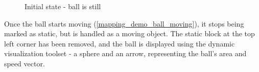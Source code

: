 \begin{figure}[!ht]
    \centering
    \caption{Initial state - ball is still}
    \label{mapping_demo_start}
\end{figure}

Once the ball starts moving (\autoref{mapping_demo_ball_moving}), it stops being marked as static, but is handled as a moving object. The static block at the top left corner has been removed, and the ball is displayed using the dynamic visualization toolset - a sphere and an arrow, representing the ball's area and speed vector.


